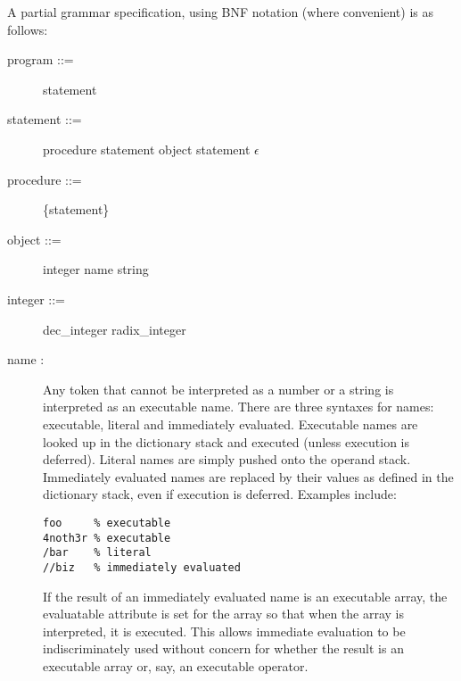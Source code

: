 A partial grammar specification, using BNF notation (where convenient) is as
follows:

\begin{description}
\item[{\lt}program{\gt} ::= ] {\lt}statement{\gt}

\item[{\lt}statement{\gt} ::= ] {\lt}procedure{\gt} {\lt}statement{\gt} {\pipe}
{\lt}object{\gt} {\lt}statement{\gt} {\pipe} $\epsilon$

\item[{\lt}procedure{\gt} ::= ] \{{\lt}statement{\gt}\}

\item[{\lt}object{\gt} ::= ] {\lt}integer{\gt} {\pipe} {\lt}name{\gt} {\pipe}
{\lt}string{\gt}

\item[{\lt}integer{\gt} ::= ] {\lt}dec\_integer{\gt} {\pipe}
{\lt}radix\_integer{\gt}

\item[{\lt}name{\gt} : ] Any token that cannot be interpreted as a number or a
string is interpreted as an executable name.  There are three syntaxes for
names: executable, literal and immediately evaluated.  Executable names are
looked up in the dictionary stack and executed (unless execution is deferred).
Literal names are simply pushed onto the operand stack.  Immediately evaluated
names are replaced by their values as defined in the dictionary stack, even if
execution is deferred.  Examples include:
\begin{verbatim}
foo     % executable
4noth3r % executable
/bar    % literal
//biz   % immediately evaluated
\end{verbatim}

If the result of an immediately evaluated name is an executable array, the
evaluatable attribute is set for the array so that when the array is
interpreted, it is executed.  This allows immediate evaluation to be
indiscriminately used without concern for whether the result is an executable
array or, say, an executable operator.


\end{description}
